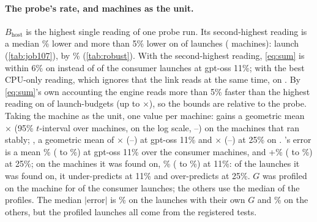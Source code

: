 

\paragraph{The probe's rate, and machines as the unit.} $B_{\mathrm{host}}$ is the highest single reading of one probe
run. Its second-highest reading is a median \rbSecondGapMed\% lower and more than 5\% lower on \rbSecondGapOverFive{} of
\rbLaunches{} launches (\rbLaunchMachines{} machines): launch \rbSecondGapLaunch{} (\cref{tab:job107}), by \rbSecondGapMax\%
(\cref{tab:robust}). With the second-highest reading,
\cref{eq:sum} is within 6\% on \rbWithinSixSecond{} instead of \rbWithinSixMax{} of the \rbConsLow{} consumer launches at
gpt-oss 11\%; with the best CPU-only reading, which ignores that the link reads at the same time, on
\rbWithinSixCpu. By \cref{eq:sum}'s own accounting the engine reads more than 5\% faster than the highest reading on
\rbAboveMax{} of \rbLaunchBudgets{} launch-budgets (up to \rbAboveMaxMax$\times$), so the bounds are relative to the probe.
Taking the machine as the unit, one value per machine: \FewOne{} gains a geometric mean
\rbPlanMean$\times$ (95\% $t$-interval over machines, on the log scale, \rbPlanLo--\rbPlanHi) on the \rbPlanMachines{} machines that ran stably;
\Margin, a geometric mean of \rbDkLow$\times$ (\rbDkLowLo--\rbDkLowHi) at gpt-oss 11\% and \rbDkMid$\times$
(\rbDkMidLo--\rbDkMidHi) at 25\% on \rbDkMachines. 's error is a mean \rbErrMean\% (\rbErrLo{} to
\rbErrHi\%) at gpt-oss 11\% over the \rbErrMachines{} consumer machines, and +\rbErrMidMean\% (\rbErrMidLo{} to
\rbErrMidHi\%) at 25\%; on the \rbErrFoundMachines{} machines it was found on, \rbErrFoundMean\% (\rbErrFoundLo{} to
\rbErrFoundHi\%) at 11\%: of the \rbFoundN{} launches it was found on, it under-predicts \rbFoundUnder{} at 11\% and
over-predicts \rbFoundOverMid{} at 25\%. $G$ was profiled on the machine for \rbConsProf{} of the \rbConsAll{} consumer
launches; the others use the median of the profiles. The median $|$error$|$ is \rbProfErrMed\% on the launches with
their own $G$ and \rbMedGErrMed\% on the others, but the profiled launches all come from the registered tests.

